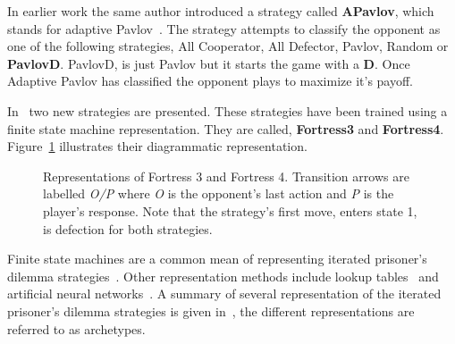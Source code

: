\documentclass{article}
\begin{document}
In earlier work the same author introduced a strategy called \textbf{APavlov},
which stands for adaptive Pavlov~\cite{Li2007}. The strategy attempts to 
classify the opponent as one of the following strategies, All Cooperator, 
All Defector, Pavlov, Random or \textbf{PavlovD}. PavlovD, is just Pavlov
but it starts the game with a \textbf{D}. Once Adaptive Pavlov has classified
the opponent plays to maximize it's payoff.

In~\cite{Ashlock2006b} two new strategies are presented. These strategies have
been trained using a finite state machine representation. They are called, 
\textbf{Fortress3} and \textbf{Fortress4}. Figure~\ref{fig:fortress3_and_4}
illustrates their diagrammatic representation.

\begin{figure}[!hbtp]
\centering
    \begin{subfigure}{.3\textwidth}
            
    \end{subfigure}
    \begin{subfigure}{.3\textwidth}\centering
         
     \end{subfigure}
     \caption{Representations of Fortress 3 and Fortress 4. Transition arrows are 
     labelled \textit{O/P} where \textit{O} is the opponent’s last action and \textit{P}
     is the player’s response. Note that the strategy’s first move, enters state 1, 
     is defection for both strategies.}
     \label{fig:fortress3_and_4}
\end{figure}

Finite state machines are a common mean of representing iterated prisoner's
dilemma strategies~\cite{Miller1996, Rubinstein1986}. Other representation
methods include lookup tables~\cite{Axelrod1987, Lindgren1994} and 
artificial neural networks~\cite{Fogel1996, Lee2015}.
A summary of several representation of the iterated prisoner's dilemma strategies
is given in~\cite{Knight2017}, the different representations are referred to as
archetypes. 


\end{document}

